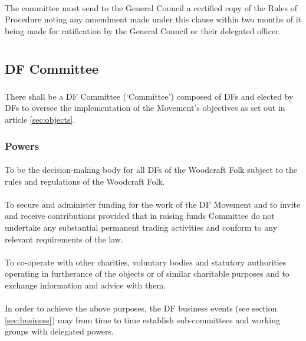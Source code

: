 \documentclass[a4paper, 11pt]{report}
\begin{document}
\subsubsection{}
The committee must send to the General Council a certified copy of the Rules of Procedure noting any amendment made under this clause within two months of it being made for ratification by the General Council or their delegated officer.

\chapter{}
\section{DF Committee}
\subsection{}
There shall be a DF Committee (`Committee') composed of DFs and elected by DFs to oversee the implementation of the Movement's objectives as set out in article \ref{sec:objects}.

\subsection{Powers}
\subsubsection{}
To be the decision-making body for all DFs of the Woodcraft Folk subject to the rules and regulations of the Woodcraft Folk.
\subsubsection{}
To secure and administer funding for the work of the DF Movement and to invite and receive contributions provided that in raising funds Committee do not undertake any substantial permanent trading activities and conform to any relevant requirements of the law.
\subsubsection{}
To co-operate with other charities, voluntary bodies and statutory authorities operating in furtherance of the objects or of similar charitable purposes and to exchange information and advice with them.
\subsubsection{}
In order to achieve the above purposes, the DF business events (see section \ref{sec:business}) may from time to time establish sub-committees and working groups with delegated powers.
\end{document}

